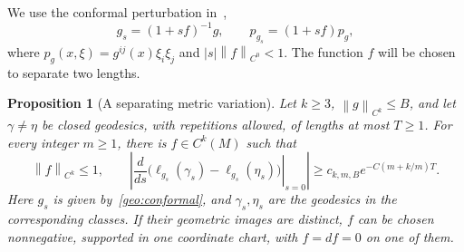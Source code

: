 \documentclass[10pt,oneside,reqno]{amsproc}
\numberwithin{equation}{section}
\newtheorem{proposition}[theorem]{Proposition}
\theoremstyle{definition}
\theoremstyle{remark}
\newcommand{\norm}[1]{\left\|#1\right\|}
\renewcommand{\ge}{\geqslant}
\renewcommand{\le}{\leqslant}
\begin{document}
We use the conformal perturbation in~\cite[Section~3.2]{KWX},
\begin{equation}
 g_s=(1+sf)^{-1}g,\qquad p_{g_s}=(1+sf)p_g,
 \label{geo:conformal}
\end{equation}
where $p_g(x,\xi)=g^{ij}(x)\xi_i\xi_j$ and $|s|\norm{f}_{C^0}<1$. The function $f$ will be chosen to separate two lengths.

\begin{proposition}[A separating metric variation]
\label{geo:detector}
Let $k\ge3$, $\norm{g}_{C^k}\le B$, and let $\gamma\ne\eta$ be closed geodesics, with repetitions allowed, of lengths at most $T\ge1$. For every integer $m\ge1$, there is $f\in C^k(M)$ such that
\begin{equation}
 \norm{f}_{C^k}\le1,\qquad \left|\left.\frac{d}{ds}\bigl(\ell_{g_s}(\gamma_s)-\ell_{g_s}(\eta_s)\bigr)\right|_{s=0}\right|\ge c_{k,m,B}e^{-C(m+k/m)T}.
 \label{geo:detectorbound}
\end{equation}
Here $g_s$ is given by~\eqref{geo:conformal}, and $\gamma_s,\eta_s$ are the geodesics in the corresponding classes. If their geometric images are distinct, $f$ can be chosen nonnegative, supported in one coordinate chart, with $f=df=0$ on one of them.
\end{proposition}
\end{document}

